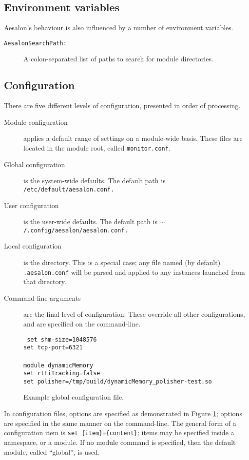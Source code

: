 \documentclass[a4paper,10pt]{report}
\begin{document}
\subsection{Environment variables}
Aesalon's behaviour is also influenced by a number of environment variables.
\begin{description}
 \item[\texttt{AesalonSearchPath:}] A colon-separated list of paths to search for module directories.
\end{description}

\subsection{Configuration}
There are five different levels of configuration, presented in order of processing.
\begin{description}
 \item[Module configuration] applies a default range of settings on a module-wide basis. These files are located in the module root, 
  called \texttt{monitor.conf}.
 \item[Global configuration] is the system-wide defaults. The default path is \texttt{/etc/default/aesalon.conf.}
 \item[User configuration] is the user-wide defaults. The default path is \texttt{$\sim$/.config/aesalon/aesalon.conf.}
 \item[Local configuration] is the directory. This is a special case; any file named (by default) \texttt{.aesalon.conf}
  will be parsed and applied to any instances launched from that directory.
 \item[Command-line arguments] are the final level of configuration. These override all other configurations, and are specified
  on the command-line.
\end{description}

\begin{figure}[h]
  \small{\texttt{%
set shm-size=1048576 \\
set tcp-port=6321 \\
\\
module dynamicMemory \\
set rttiTracking=false \\
set polisher=/tmp/build/dynamicMemory\_polisher-test.so \\
  }}
  \caption{Example global configuration file.\label{exampleconfigfile}}
\end{figure}

In configuration files, options are specified as demonstrated in Figure \ref{exampleconfigfile}; options are specified in the
same manner on the command-line. The general form of a configuration item is \texttt{set \{item\}=\{content\}}; items may be
specified inside a namespace, or a module. If no module command is specified, then the default module, called ``global'', is
used.
\end{document}
